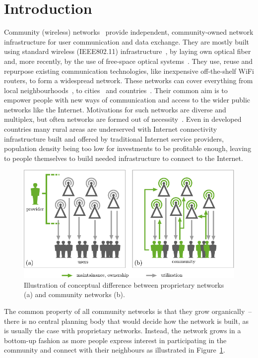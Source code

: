 \documentclass[5p,sort&compress]{elsarticle}
\begin{document}
\section{Introduction}

Community (wireless) networks~\cite{Bruno_2005,Frangoudis_2011} provide independent, community-owned network infrastructure for user communication and data exchange.
They are mostly built using standard wireless (IEEE802.11) infrastructure~\cite{Akyildiz_2005}, by laying own optical fiber and, more recently, by the use of free-space optical systems~\cite{Mustafa_2013}.
They use, reuse and repurpose existing communication technologies, like inexpensive off-the-shelf WiFi routers, to form a widespread network.
These networks can cover everything from local neighbourhoods~\cite{RedHook_2013}, to cities~\cite{AWMN} and countries~\cite{wlanslovenija_2009, guifi_2003, Funkfeuer_2003, Freifunk_2003}.
Their common aim is to empower people with new ways of communication and access to the wider public networks like the Internet.
Motivations for such networks are diverse and multiplex, but often networks are formed out of necessity~\cite{WNDW_2013}.
Even in developed countries many rural areas are underserved with Internet connectivity infrastructure built and offered by traditional Internet service providers, population density being too low for investments to be profitable enough, leaving to people themselves to build needed infrastructure to connect to the Internet.

\begin{figure}[t]
  \centering
  \includegraphics[width=\columnwidth]{figures/community.pdf}
  \caption{Illustration of conceptual difference between proprietary networks (a) and community networks (b).}
  \label{fig:community}
\end{figure}

The common property of all community networks is that they grow organically~-- there is no central planning body that would decide how the network is built, as is usually the case with proprietary networks.
Instead, the network grows in a bottom-up fashion as more people express interest in participating in the community and connect with their neighbours as illustrated in Figure~\ref{fig:community}.
\end{document}
